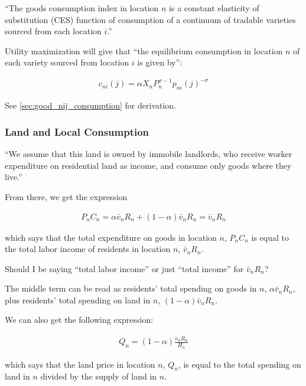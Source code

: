 \documentclass[10pt]{article}
\begin{document}
``The goods consumption index in location $n$ is a constant elasticity of 
substitution (CES) function of consumption of a continuum of tradable 
varieties sourced from each location $i$.''

Utility maximization 
will give that ``the equilibrium consumption 
in location $n$ of each variety sourced from 
location $i$ 
is given by'':

\begin{align}
    c_{n i}(j)=\alpha X_n P_n^{\sigma-1} p_{n i}(j)^{-\sigma} \label{eq:good_nij_consumption}
\end{align}

See \autoref{sec:good_nij_consumption} for derivation.

\subsubsection{Land and Local Consumption}

``We assume that this land is owned by immobile landlords,
who receive worker expenditure on residential land as income, and consume only
goods where they live.''

From there, we get the expression

\begin{align}
    P_n C_n=\alpha \bar{v}_n R_n+(1-\alpha) \bar{v}_n R_n=\bar{v}_n R_n \label{eq:land_and_local_consumption}
\end{align}

which says that the 
total expenditure on goods in location $n$, $P_n C_n$
is equal to the total labor income of 
residents in location $n$, $\bar{v}_n R_n$.

\begin{questions}
    Should I be saying ``total labor income'' or just ``total income''
    for $\bar{v}_n R_n$?
\end{questions}

The middle term can be read as 
residents' total spending on goods in $n$,
$\alpha \bar{v}_n R_n$, plus 
residents' total spending on land in $n$,
$(1-\alpha) \bar{v}_n R_n$.

We can also get the following expression:

\begin{align}
    Q_n=(1-\alpha) \frac{\bar{v}_n R_n}{H_n} \label{eq:land_market_clearing2}
\end{align}

which says that 
the land price in location $n$, $Q_n$,
is equal to the total spending on land in $n$ 
divided by the supply of land in $n$.
\end{document}
